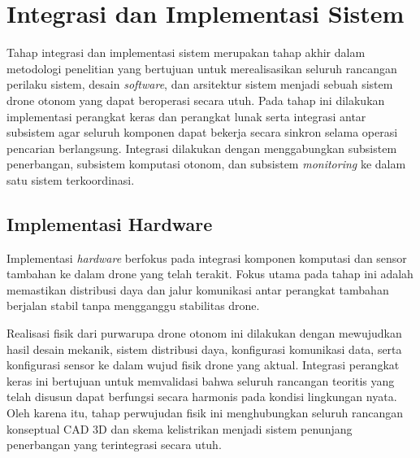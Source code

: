 \section{Integrasi dan Implementasi Sistem}
Tahap integrasi dan implementasi sistem merupakan tahap akhir dalam metodologi penelitian yang bertujuan untuk merealisasikan seluruh rancangan perilaku sistem, desain \textit{software}, dan arsitektur sistem menjadi sebuah sistem drone otonom yang dapat beroperasi secara utuh. Pada tahap ini dilakukan implementasi perangkat keras dan perangkat lunak serta integrasi antar subsistem agar seluruh komponen dapat bekerja secara sinkron selama operasi pencarian berlangsung. Integrasi dilakukan dengan menggabungkan subsistem penerbangan, subsistem komputasi otonom, dan subsistem \textit{monitoring} ke dalam satu sistem terkoordinasi.

\subsection{Implementasi Hardware}
Implementasi \textit{hardware} berfokus pada integrasi komponen komputasi dan sensor tambahan ke dalam drone yang telah terakit. Fokus utama pada tahap ini adalah memastikan distribusi daya dan jalur komunikasi antar perangkat tambahan berjalan stabil tanpa mengganggu stabilitas drone.

Realisasi fisik dari purwarupa drone otonom ini dilakukan dengan mewujudkan hasil desain mekanik, sistem distribusi daya, konfigurasi komunikasi data, serta konfigurasi sensor ke dalam wujud fisik drone yang aktual. Integrasi perangkat keras ini bertujuan untuk memvalidasi bahwa seluruh rancangan teoritis yang telah disusun dapat berfungsi secara harmonis pada kondisi lingkungan nyata. Oleh karena itu, tahap perwujudan fisik ini menghubungkan seluruh rancangan konseptual CAD 3D dan skema kelistrikan menjadi sistem penunjang penerbangan yang terintegrasi secara utuh.

